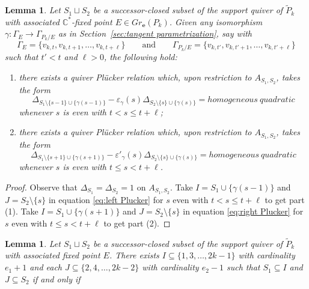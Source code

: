 \documentclass{amsart}
\newtheorem{lemma}[theorem]{Lemma}
\numberwithin{equation}{section}
\newcommand{\CC}{\mathbb{C}}
\newcommand{\bfe}{\mathbf{e}}
\begin{document}
  \begin{lemma}
    Let $S_1\sqcup S_2$ be a successor-closed subset of the support quiver of $\tilde P_k$ with associated $\CC^*$-fixed point $E\in Gr_\bfe(P_k)$.
    Given any isomorphism $\gamma:\Gamma_E\to\Gamma_{P_k/E}$ as in Section~\ref{sec:tangent parametrization}, say with
    \[\Gamma_E=\{v_{k,t},v_{k,t+1},\ldots,v_{k,t+\ell}\}\qquad\text{and}\qquad\Gamma_{P_k/E}=\{v_{k,t'},v_{k,t'+1},\ldots,v_{k,t'+\ell}\}\]
    such that $t'<t$ and $\ell>0$, the following hold:
    \begin{enumerate}
      \item there exists a quiver Pl\"ucker relation which, upon restriction to $A_{S_1,S_2}$, takes the form
        \[\Delta_{S_1\setminus\{s-1\}\cup\{\gamma(s-1)\}}-\varepsilon_\gamma(s)\Delta_{S_2\setminus\{s\}\cup\{\gamma(s)\}}=homogeneous~quadratic\]
        whenever $s$ is even with $t<s\le t+\ell$;
      \item there exists a quiver Pl\"ucker relation which, upon restriction to $A_{S_1,S_2}$, takes the form
        \[\Delta_{S_1\setminus\{s+1\}\cup\{\gamma(s+1)\}}-\varepsilon'_\gamma(s)\Delta_{S_2\setminus\{s\}\cup\{\gamma(s)\}}=homogeneous~quadratic\]
        whenever $s$ is even with $t\le s<t+\ell$.
    \end{enumerate}
  \end{lemma}
  \begin{proof}
    Observe that $\Delta_{S_1}=\Delta_{S_2}=1$ on $A_{S_1,S_2}$.
    Take $I=S_1\cup\{\gamma(s-1)\}$ and $J=S_2\setminus\{s\}$ in equation \eqref{eq:left Plucker} for $s$ even with $t<s\le t+\ell$ to get part (1).
    Take $I=S_1\cup\{\gamma(s+1)\}$ and $J=S_2\setminus\{s\}$ in equation \eqref{eq:right Plucker} for $s$ even with $t\le s<t+\ell$ to get part (2).
  \end{proof}

  \begin{lemma}
    Let $S_1\sqcup S_2$ be a successor-closed subset of the support quiver of $\tilde P_k$ with associated fixed point $E$.
    There exists $I\subseteq\{1,3,\ldots,2k-1\}$ with cardinality $e_1+1$ and each $J\subseteq\{2,4,\ldots, 2k-2\}$ with cardinality $e_2-1$ such that $S_1\subseteq I$ and $J\subseteq S_2$ if and only if 
  \end{lemma}
  
\end{document}
